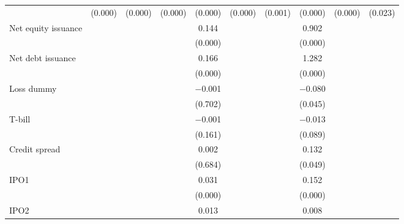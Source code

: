 \begin{longtable}{l*{9}{c}}
                    &     (0.000)&     (0.000)&     (0.000)&     (0.000)&     (0.000)&     (0.001)&     (0.000)&     (0.000)&     (0.023)\\
\addlinespace
Net equity issuance &            &            &            &       0.144&            &            &       0.902&            &            \\
                    &            &            &            &     (0.000)&            &            &     (0.000)&            &            \\
\addlinespace
Net debt issuance   &            &            &            &       0.166&            &            &       1.282&            &            \\
                    &            &            &            &     (0.000)&            &            &     (0.000)&            &            \\
\addlinespace
Loss dummy          &            &            &            &    $-$0.001&            &            &    $-$0.080&            &            \\
                    &            &            &            &     (0.702)&            &            &     (0.045)&            &            \\
\addlinespace
T-bill              &            &            &            &    $-$0.001&            &            &    $-$0.013&            &            \\
                    &            &            &            &     (0.161)&            &            &     (0.089)&            &            \\
\addlinespace
Credit spread       &            &            &            &       0.002&            &            &       0.132&            &            \\
                    &            &            &            &     (0.684)&            &            &     (0.049)&            &            \\
\addlinespace
IPO1                &            &            &            &       0.031&            &            &       0.152&            &            \\
                    &            &            &            &     (0.000)&            &            &     (0.000)&            &            \\
\addlinespace
IPO2                &            &            &            &       0.013&            &            &       0.008&            &            \\

\end{longtable}
